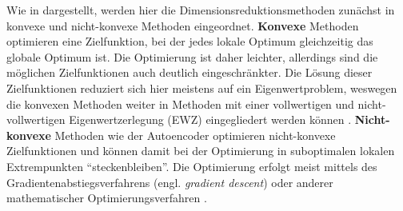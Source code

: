 Wie in  dargestellt, werden hier die Dimensionsreduktionsmethoden
zunächst in konvexe und nicht-konvexe Methoden eingeordnet. \textbf{Konvexe} Methoden optimieren
eine Zielfunktion, bei der jedes lokale Optimum gleichzeitig das globale Optimum ist. Die
Optimierung ist daher leichter, allerdings sind die möglichen Zielfunktionen auch deutlich
eingeschränkter. Die Lösung dieser Zielfunktionen reduziert sich hier meistens auf ein
Eigenwertproblem, weswegen die konvexen Methoden weiter in Methoden mit einer vollwertigen und
nicht-vollwertigen Eigenwertzerlegung (EWZ) eingegliedert werden können \parencite[3]{vanderMaaten.2009}. \textbf{Nicht-konvexe} Methoden wie der Autoencoder optimieren
nicht-konvexe Zielfunktionen und können damit bei der Optimierung in suboptimalen lokalen
Extrempunkten \enquote{steckenbleiben}. Die Optimierung erfolgt meist mittels des
Gradientenabstiegsverfahrens (engl. \textit{gradient descent}) oder anderer mathematischer
Optimierungsverfahren \parencite[siehe z.B.][]{Guler.2010}.


